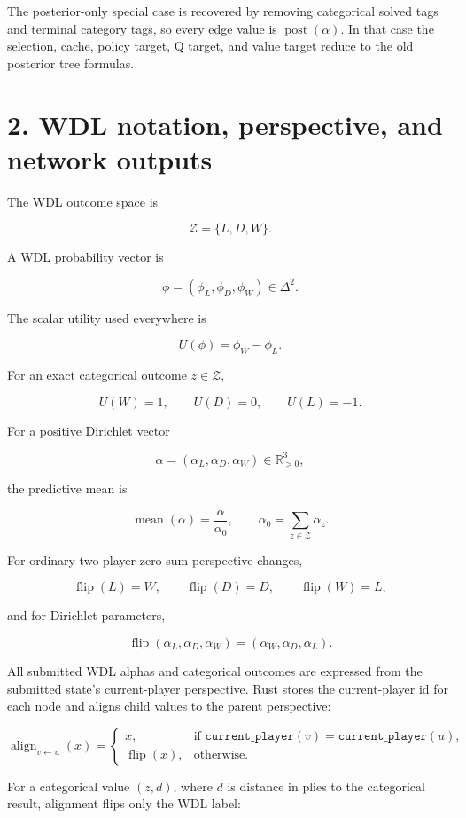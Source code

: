 \documentclass[11pt]{article}
\newcommand{\R}{\mathbb{R}}
\newcommand{\mean}{\operatorname{mean}}
\newcommand{\Z}{\mathcal{Z}}
\newcommand{\Flip}{\operatorname{flip}}
\newcommand{\Align}{\operatorname{align}}
\newcommand{\Utility}{U}
\newcommand{\Posterior}{\operatorname{post}}
\begin{document}
The posterior-only special case is recovered by removing categorical solved tags
and terminal category tags, so every edge value is \(\Posterior(\alpha)\). In
that case the selection, cache, policy target, Q target, and value target reduce
to the old posterior tree formulas.

\section*{2. WDL notation, perspective, and network outputs}

The WDL outcome space is

\[
\Z=\{L,D,W\}.
\]

A WDL probability vector is

\[
\phi=(\phi_L,\phi_D,\phi_W)\in\Delta^2.
\]

The scalar utility used everywhere is

\[
\Utility(\phi)=\phi_W-\phi_L.
\]

For an exact categorical outcome \(z\in\Z\),

\[
\Utility(W)=1,
\qquad
\Utility(D)=0,
\qquad
\Utility(L)=-1.
\]

For a positive Dirichlet vector

\[
\alpha=(\alpha_L,\alpha_D,\alpha_W)\in\R_{>0}^3,
\]

the predictive mean is

\[
\mean(\alpha)=\frac{\alpha}{\alpha_0},
\qquad
\alpha_0=\sum_{z\in\Z}\alpha_z.
\]

For ordinary two-player zero-sum perspective changes,

\[
\Flip(L)=W,
\qquad
\Flip(D)=D,
\qquad
\Flip(W)=L,
\]

and for Dirichlet parameters,

\[
\Flip(\alpha_L,\alpha_D,\alpha_W)=(\alpha_W,\alpha_D,\alpha_L).
\]

All submitted WDL alphas and categorical outcomes are expressed from the
submitted state's current-player perspective. Rust stores the current-player id
for each node and aligns child values to the parent perspective:

\[
\Align_{v\leftarrow u}(x)=
\begin{cases}
x,&\text{if } \texttt{current\_player}(v)=\texttt{current\_player}(u),\\
\Flip(x),&\text{otherwise.}
\end{cases}
\]

For a categorical value \((z,d)\), where \(d\) is distance in plies to the
categorical result, alignment flips only the WDL label:
\end{document}
